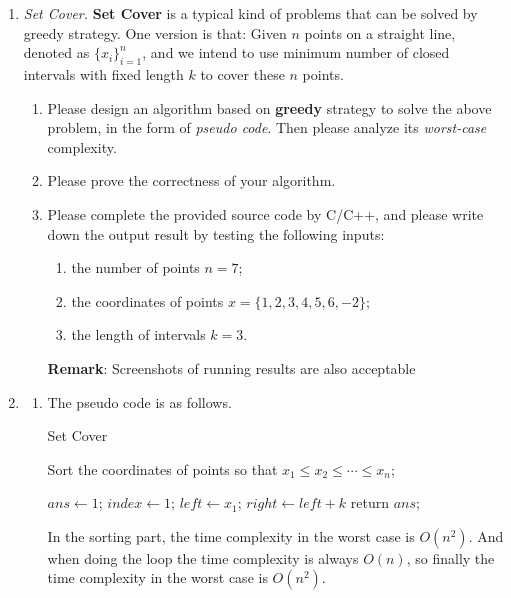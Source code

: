 \documentclass[12pt,a4paper]{article}
\makeatletter
\newtheorem*{solution}{Solution}
\theoremstyle{definition}
\renewenvironment{solution}[1][Solution] {\par\pushQED{\qed}\normalfont\topsep6\p@\@plus6\p@\relax\trivlist\item[\hskip\labelsep\bfseries#1\@addpunct{.}]\ignorespaces}{\popQED\endtrivlist\@endpefalse} \makeatother
\makeatother
\begin{document}
\begin{enumerate}
    \item \textit{Set Cover.} \textbf{Set Cover} is a typical kind of problems that can be solved by greedy strategy. One version is that: Given $n$ points on a straight line, denoted as $\{x_i\}_{i=1}^n$, and we intend to use minimum number of closed intervals with fixed length $k$ to cover these $n$ points.
    \begin{enumerate}
    	\item Please design an algorithm based on \textbf{greedy} strategy to solve the above problem, in the form of \emph{pseudo code}. Then please analyze its \emph{worst-case} complexity.
    	\item Please prove the correctness of your algorithm.
    	\item Please complete the provided source code by C/C++, and please write down the output result by testing the following inputs: 
    	\begin{enumerate}
    		\item the number of points $n=7$;
    		\item the coordinates of points
    		$x=\{1,2,3,4,5,6,-2\}$;
    		\item the length of intervals
    		$k=3$.
    	\end{enumerate}
        \textbf{Remark}: Screenshots of running results are also acceptable 
    \end{enumerate}
    \begin{solution}
        \begin{enumerate}
        \item The pseudo code is as follows.\\
        \begin{minipage}[t]{0.88\textwidth}
        \begin{algorithm}[H]
		\caption{Set Cover}\label{Alg-SetCover}
		
		Sort the coordinates of points so that $x_1\leqslant x_2\leqslant \cdots \leqslant x_n$;
		
		$ans \leftarrow 1$; $index \leftarrow 1$; $left \leftarrow x_1$; $right \leftarrow left+k$\;
		return $ans$;
	\end{algorithm}
	
	In the sorting part, the time complexity in the worst case is $O(n^2)$. And when doing the loop the time complexity is always $O(n)$, so finally the time complexity in the worst case is $O(n^2)$.
	\end{minipage}
	

\end{enumerate}
\end{solution}
\end{enumerate}
\end{document}
